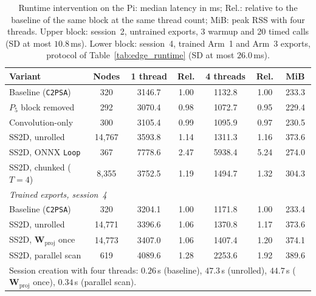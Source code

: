 \begin{table}[t]
\caption{Runtime intervention on the Pi: median latency in ms; Rel.: relative to the baseline of the same block at the same thread count; MiB: peak RSS with four threads. Upper block: session~2, untrained exports, 3 warmup and 20 timed calls (SD at most $10.8$\,ms). Lower block: session~4, trained Arm~1 and Arm~3 exports, protocol of Table~\ref{tab:edge_runtime} (SD at most $26.0$\,ms).}
\label{tab:g1_intervention}
\centering
\footnotesize
\setlength{\tabcolsep}{5pt}
\begin{tabular}{lcccccc}
\toprule
\textbf{Variant} & \textbf{Nodes} & \textbf{1 thread} & \textbf{Rel.} & \textbf{4 threads} & \textbf{Rel.} & \textbf{MiB} \\
\midrule
Baseline (\texttt{C2PSA}) & 320 & 3146.7 & 1.00 & 1132.8 & 1.00 & 233.3 \\
$P_5$ block removed & 292 & 3070.4 & 0.98 & 1072.7 & 0.95 & 229.4 \\
Convolution-only & 300 & 3105.4 & 0.99 & 1095.9 & 0.97 & 230.5 \\
SS2D, unrolled & 14{,}767 & 3593.8 & 1.14 & 1311.3 & 1.16 & 373.6 \\
SS2D, ONNX \texttt{Loop} & 367 & 7778.6 & 2.47 & 5938.4 & 5.24 & 274.0 \\
SS2D, chunked ($T = 4$) & 8{,}355 & 3752.5 & 1.19 & 1494.7 & 1.32 & 304.3 \\
\midrule
\multicolumn{7}{l}{\textit{Trained exports, session~4}} \\
Baseline (\texttt{C2PSA}) & 320 & 3204.1 & 1.00 & 1171.8 & 1.00 & 233.4 \\
SS2D, unrolled & 14{,}771 & 3396.6 & 1.06 & 1370.8 & 1.17 & 373.6 \\
SS2D, $\mathbf{W}_{\text{proj}}$ once & 14{,}773 & 3407.0 & 1.06 & 1407.4 & 1.20 & 374.1 \\
SS2D, parallel scan & 619 & 4089.6 & 1.28 & 2253.6 & 1.92 & 389.6 \\
\bottomrule
\multicolumn{7}{p{0.92\textwidth}}{\scriptsize Session creation with four threads: $0.26$\,s (baseline), $47.3$\,s (unrolled), $44.7$\,s ($\mathbf{W}_{\text{proj}}$ once), $0.34$\,s (parallel scan).} \\
\end{tabular}
\end{table}

